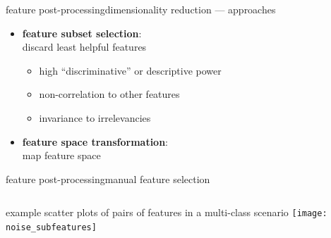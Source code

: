 		\begin{frame}{feature post-processing}{dimensionality reduction --- approaches}
			\begin{itemize}
				\item	\textbf{feature subset selection}:\\ discard least helpful features
                    \pause
                    \begin{itemize}
                        \item	high ``discriminative'' or descriptive power
                        \item	non-correlation to other features
                        \item	invariance to irrelevancies
                    \end{itemize}
				\bigskip
				\item<2->	\textbf{feature space transformation}:\\ map feature space
			\end{itemize}
		\end{frame}
		\begin{frame}{feature post-processing}{manual feature selection}
            \begin{columns}[T]
                example scatter plots of pairs of features in a multi-class scenario
                    \texttt{[image: noise\_subfeatures]}
            \end{columns}
		\end{frame}
        
